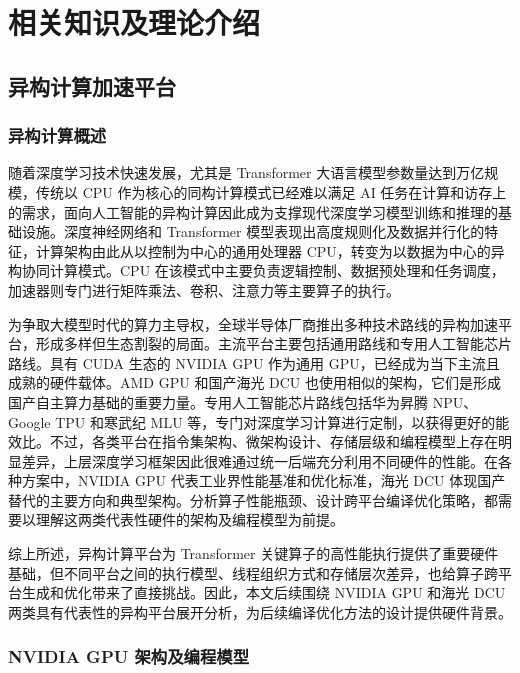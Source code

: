 
\chapter{相关知识及理论介绍}

\section{异构计算加速平台}
\subsection{异构计算概述}

随着深度学习技术快速发展，尤其是 Transformer 大语言模型参数量达到万亿规模，传统以 CPU 作为核心的同构计算模式已经难以满足 AI 任务在计算和访存上的需求，面向人工智能的异构计算因此成为支撑现代深度学习模型训练和推理的基础设施。深度神经网络和 Transformer 模型表现出高度规则化及数据并行化的特征，计算架构由此从以控制为中心的通用处理器 CPU，转变为以数据为中心的异构协同计算模式。CPU 在该模式中主要负责逻辑控制、数据预处理和任务调度，加速器则专门进行矩阵乘法、卷积、注意力等主要算子的执行\cite{jouppi2017datacenter}。

为争取大模型时代的算力主导权，全球半导体厂商推出多种技术路线的异构加速平台，形成多样但生态割裂的局面。主流平台主要包括通用路线和专用人工智能芯片路线\cite{jouppi2021ten}。具有 CUDA 生态的 NVIDIA GPU 作为通用 GPU，已经成为当下主流且成熟的硬件载体。AMD GPU 和国产海光 DCU 也使用相似的架构，它们是形成国产自主算力基础的重要力量。专用人工智能芯片路线包括华为昇腾 NPU、Google TPU 和寒武纪 MLU 等，专门对深度学习计算进行定制，以获得更好的能效比。不过，各类平台在指令集架构、微架构设计、存储层级和编程模型上存在明显差异，上层深度学习框架因此很难通过统一后端充分利用不同硬件的性能。在各种方案中，NVIDIA GPU 代表工业界性能基准和优化标准，海光 DCU 体现国产替代的主要方向和典型架构。分析算子性能瓶颈、设计跨平台编译优化策略，都需要以理解这两类代表性硬件的架构及编程模型为前提。

综上所述，异构计算平台为 Transformer 关键算子的高性能执行提供了重要硬件基础，但不同平台之间的执行模型、线程组织方式和存储层次差异，也给算子跨平台生成和优化带来了直接挑战。因此，本文后续围绕 NVIDIA GPU 和海光 DCU 两类具有代表性的异构平台展开分析，为后续编译优化方法的设计提供硬件背景。

\subsection{NVIDIA GPU 架构及编程模型}

